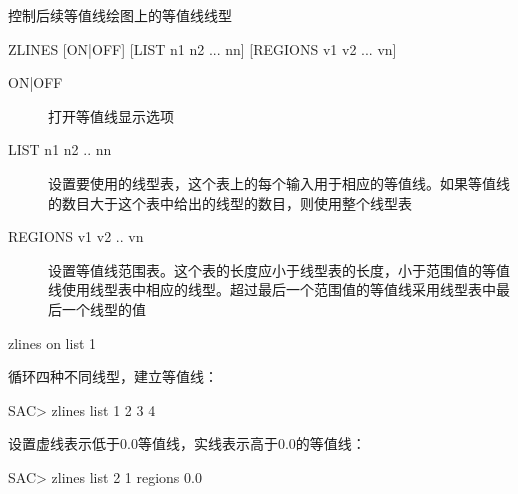 \label{cmd:zlines}

控制后续等值线绘图上的等值线线型

\begin{SACSTX}
ZLINES  [ON|OFF] [LIST n1 n2 ... nn] [REGIONS v1 v2 ... vn]
\end{SACSTX}

\begin{description}
\item [ON|OFF] 打开等值线显示选项
\item [LIST n1 n2 .. nn] 设置要使用的线型表，这个表上的每个输入用于相应的等值线。如果等值线的数目大于这个表中给出的线型的数目，则使用整个线型表
\item [REGIONS v1 v2 .. vn] 设置等值线范围表。这个表的长度应小于线型表的长度，小于范围值的等值线使用线型表中相应的线型。超过最后一个范围值的等值线采用线型表中最后一个线型的值
\end{description}

\begin{SACDFT}
zlines on list 1
\end{SACDFT}

循环四种不同线型，建立等值线：
\begin{SACCode}
SAC> zlines list 1 2 3 4
\end{SACCode}

设置虚线表示低于0.0等值线，实线表示高于0.0的等值线：
\begin{SACCode}
SAC> zlines list 2 1 regions 0.0
\end{SACCode}
